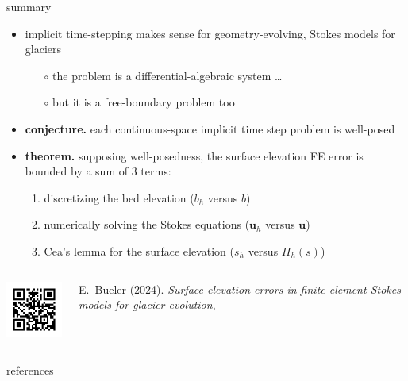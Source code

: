 \documentclass[10pt,dvipsnames]{beamer}
\newcommand{\bu}{\mathbf{u}}
\begin{document}
\begin{frame}{summary}
\begin{itemize}
\item implicit time-stepping makes sense for geometry-evolving, Stokes models for glaciers
    \begin{itemize}
    \item[$\circ$] the problem is a differential-algebraic system \dots
    \item[$\circ$] but it is a free-boundary problem too
    \end{itemize}
\item \textbf{conjecture.} each continuous-space implicit time step problem is well-posed
\item \textbf{theorem.} supposing well-posedness, the surface elevation FE error is bounded by a sum of 3 terms:
    \begin{enumerate}
    \item discretizing the bed elevation ($b_h$ versus $b$)
    \item numerically solving the Stokes equations ($\bu_h$ versus $\bu$)
    \item Cea's lemma for the surface elevation ($s_h$ versus $\Pi_h(s)$) \strut
    \end{enumerate}
\end{itemize}

\noindent \hrulefill
\begin{columns}
\begin{column}{0.22\textwidth}
\includegraphics[width=\textwidth]{qrpreprint.png}
\end{column}
\begin{column}{0.78\textwidth}
{\small
E.~Bueler (2024). \emph{Surface elevation errors in finite element {S}tokes models for glacier evolution}, 
}
\end{column}
\end{columns}

\end{frame}


\begin{frame}{references}

{\footnotesize }
\end{frame}
\end{document}
